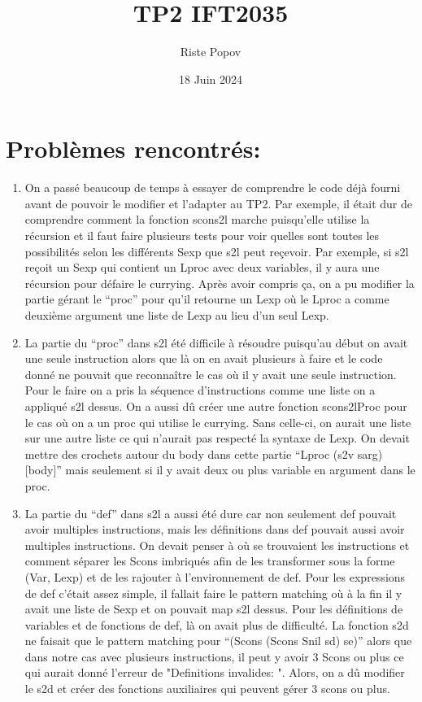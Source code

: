 \documentclass{article}
\title{TP2 IFT2035}
\author{Riste Popov}
\date{18 Juin 2024}
\begin{document}
\maketitle

\section*{Problèmes rencontrés:}
\begin{enumerate}
    \item On a passé beaucoup de temps à essayer de comprendre le code déjà fourni avant de pouvoir le modifier et l’adapter au TP2. Par exemple, il était dur de comprendre comment la fonction scons2l marche puisqu’elle utilise la récursion et il faut faire plusieurs tests pour voir quelles sont toutes les possibilités selon les différents Sexp que s2l peut reçevoir. Par exemple, si s2l reçoit un Sexp qui contient un Lproc avec deux variables, il y aura une récursion pour défaire le currying. Après avoir compris ça, on a pu modifier la partie gérant le “proc” pour qu’il retourne un Lexp où le Lproc a comme deuxième argument une liste de Lexp au lieu d’un seul Lexp. 

    
    \item  La partie du “proc” dans s2l été difficile à résoudre puisqu’au début on avait une seule instruction alors que là on en avait plusieurs à faire et le code donné ne pouvait que reconnaître le cas où il y avait une seule instruction. Pour le faire on a pris la séquence d’instructions comme une liste on a appliqué s2l dessus. On a aussi dû créer une autre fonction scons2lProc pour le cas où on a un proc qui utilise le currying. Sans celle-ci, on aurait une liste sur une autre liste ce qui n’aurait pas respecté la syntaxe de Lexp. On devait mettre des crochets autour du body dans cette partie “Lproc (s2v sarg) [body]” mais seulement si il y avait deux ou plus variable en argument dans le proc.
    
    
     \item  La partie du “def” dans s2l a aussi été dure car non seulement def pouvait avoir multiples instructions, mais les définitions dans def pouvait aussi avoir multiples instructions. On devait penser à où se trouvaient les instructions et comment séparer les Scons imbriqués afin de les transformer sous la forme (Var, Lexp) et de les rajouter à l’environnement de def. Pour les expressions de def c’était assez simple, il fallait faire le pattern matching où à la fin il y avait une liste de Sexp et on pouvait map s2l dessus. Pour les définitions de variables et de fonctions de def, là on avait plus de difficulté. La fonction s2d ne faisait que le pattern matching pour “(Scons (Scons Snil sd) se)” alors que dans notre cas avec plusieurs instructions, il peut y avoir 3 Scons ou plus ce qui aurait donné l’erreur de "Definitions invalides: ". Alors, on a dû modifier le s2d et créer des fonctions auxiliaires  qui peuvent gérer 3 scons ou plus. 


\end{enumerate}
\end{document}

